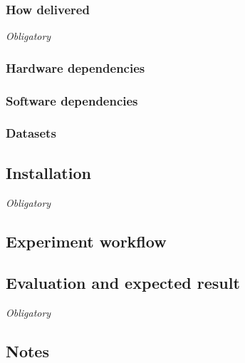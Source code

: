 \documentclass{sigplanconf}
\begin{document}
\subsubsection{How delivered}

{\em Obligatory}

\subsubsection{Hardware dependencies}

\subsubsection{Software dependencies}

\subsubsection{Datasets}

\subsection{Installation}

{\em Obligatory}

\subsection{Experiment workflow}

\subsection{Evaluation and expected result}

{\em Obligatory}

\subsection{Notes}

\end{document}
